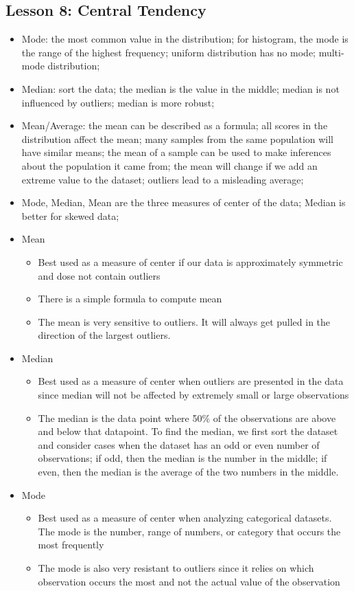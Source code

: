 \documentclass[twoside,12pt]{article}
\begin{document}
\subsection{Lesson 8: Central Tendency}
\begin{itemize}
\item Mode: the most common value in the distribution; for histogram, the mode is the range of the highest frequency; uniform distribution has no mode; multi-mode distribution; 
\item Median: sort the data; the median is the value in the middle; median is not influenced by outliers; median is more robust; 
\item Mean/Average: the mean can be described as a formula; all scores in the distribution affect the mean; many samples from the same population will have similar means; the mean of a sample can be used to make inferences about the population it came from; the mean will change if we add an extreme value to the dataset; outliers lead to a misleading average; 
\item Mode, Median, Mean are the three measures of center of the data; Median is better for skewed data;
\item Mean
\begin{itemize}
\item Best used as a measure of center if our data is approximately symmetric and dose not contain outliers 
\item There is a simple formula to compute mean
\item The mean is very sensitive to outliers. It will always get pulled in the direction of the largest outliers. 
\end{itemize}
\item Median
\begin{itemize}
\item Best used as a measure of center when outliers are presented in the data since median will not be affected by extremely small or large observations
\item The median is the data point where 50\% of the observations are above and below that datapoint. To find the median, we first sort the dataset and consider cases when the dataset has an odd or even number of observations; if odd, then the median is the number in the middle; if even, then the median is the average of the two numbers in the middle.
\end{itemize}
\item Mode
\begin{itemize}
\item Best used as a measure of center when analyzing categorical datasets. The mode is the number, range of numbers, or category that occurs the most frequently
\item The mode is also very resistant to outliers since it relies on which observation occurs the most and not the actual value of the observation
\end{itemize}
\end{itemize}
\end{document}
